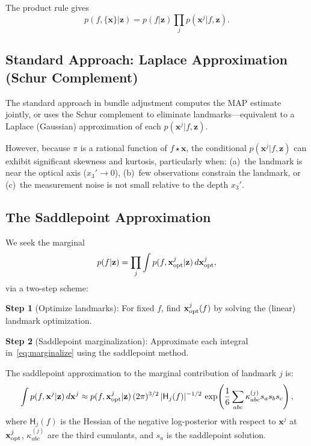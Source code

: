 \documentclass[journal]{IEEEtran}
\newcommand{\beq}{\begin{equation}}
\newcommand{\eeq}{\end{equation}}
\begin{document}
The product rule gives
\beq
    p(f, \{\mathbf{x}\} | \mathbf{z}) = 
    p(f | \mathbf{z}) \prod_j p(\mathbf{x}^j | f, \mathbf{z}).
    \label{eq:productrule}
\eeq

\subsection{Standard Approach: Laplace Approximation (Schur Complement)}

The standard approach in bundle adjustment computes 
the MAP estimate jointly, or uses the Schur complement 
to eliminate landmarks---equivalent to a Laplace 
(Gaussian) approximation of each $p(\mathbf{x}^j | f, \mathbf{z})$.

However, because $\pi$ is a rational function of $f \star \mathbf{x}$, 
the conditional $p(\mathbf{x}^j | f, \mathbf{z})$ can exhibit 
significant skewness and kurtosis, particularly when:
(a)~the landmark is near the optical axis ($x_3' \to 0$),
(b)~few observations constrain the landmark, or
(c)~the measurement noise is not small relative to the 
depth $x_3'$.

\subsection{The Saddlepoint Approximation}

We seek the marginal
\beq
    p(f | \mathbf{z}) = \prod_j \int 
    p(f, \mathbf{x}^j_{\rm opt} | \mathbf{z})\, 
    d\mathbf{x}^j_{\rm opt},
    \label{eq:marginalize}
\eeq
via a two-step scheme:

\textbf{Step 1} (Optimize landmarks): For fixed $f$, 
find $\mathbf{x}^j_{\rm opt}(f)$ by solving the 
(linear) landmark optimization.

\textbf{Step 2} (Saddlepoint marginalization): 
Approximate each integral in~\eqref{eq:marginalize} 
using the saddlepoint method.

The saddlepoint approximation to the marginal 
contribution of landmark $j$ is:
\beq
    \int p(f, \mathbf{x}^j | \mathbf{z})\, d\mathbf{x}^j
    \approx 
    p(f, \mathbf{x}^j_{\rm opt} | \mathbf{z})\,
    (2\pi)^{3/2}\, |\mathsf{H}_j(f)|^{-1/2}\,
    \exp\!\left(\frac{1}{6}\sum_{abc} 
    \kappa_{abc}^{(j)} s_a s_b s_c\right),
    \label{eq:saddlepoint}
\eeq
where $\mathsf{H}_j(f)$ is the Hessian of the 
negative log-posterior with respect to $\mathbf{x}^j$ 
at $\mathbf{x}^j_{\rm opt}$, $\kappa_{abc}^{(j)}$ 
are the third cumulants, and $s_a$ is the saddlepoint 
solution.
\end{document}

